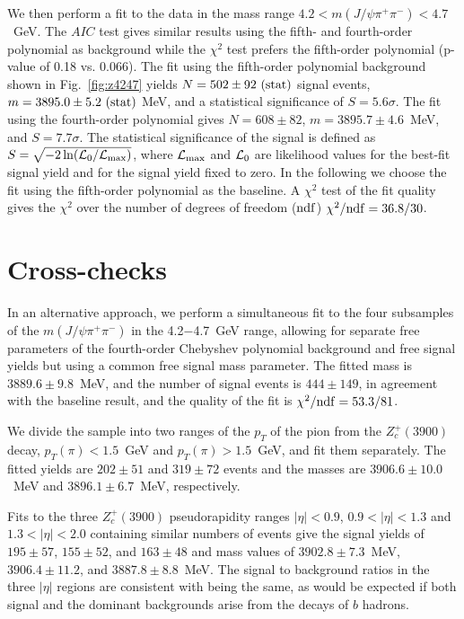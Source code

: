\documentclass[aps,prd,twocolumn,superscriptaddress,groupedaddress,floatfix]{revtex4}
\begin{document}
 We then perform a  fit to the data in the mass
 range  $4.2<m(J/\psi \pi^+ \pi^-)<4.7$~GeV.
The $AIC$ test gives similar results using  the fifth- and fourth-order polynomial
as background while the $\chi^2$ test prefers the fifth-order polynomial
(p-value of 0.18 vs. 0.066). 
The fit using the fifth-order polynomial background shown in  Fig.~\ref{fig:z4247}  yields  
 $N=502\pm 92~({\rm stat})$ signal events,
$m=3895.0\pm5.2~({\rm stat}) $ MeV, and a statistical significance of $S=5.6\sigma$.
The fit using the fourth-order polynomial gives 
$N=608\pm82$, $m=3895.7\pm4.6$~MeV,  and $S=7.7\sigma$.
The statistical significance of the signal 
is defined as $S=\sqrt{-2\, {\rm ln} ({\cal{L}}_0 /{\cal{L}}_{\rm max}) }$,
where ${\cal{L}}_{\rm max}$ and ${\cal{L}}_0$  are likelihood values for the
best-fit signal yield and for the signal yield fixed to zero.
In the following we choose the fit using the fifth-order polynomial as the baseline.
A $\chi^2$ test of the fit quality gives the  $\chi^2$ over the number of degrees
of freedom ($\rm ndf$)   $\chi^2/{\rm ndf}=36.8/30$.






\section{Cross-checks}


In an alternative approach, we perform a simultaneous fit to the four  subsamples
of the $m(J/\psi \pi^+ \pi^-)$ in the  4.2$-$4.7~GeV range,
allowing for separate free   parameters  of the fourth-order Chebyshev polynomial background  and
free  signal yields but using a common free signal mass
parameter.  
The fitted mass is 
$3889.6 \pm 9.8$~MeV, and the number of signal events is $444 \pm 149$, in agreement with the baseline
result,
and the quality of the fit is $\chi^2/{\rm ndf}=53.3/81$.


We divide the sample into two ranges of the  $p_T$ of the pion from the $Z_c^+(3900)$ decay,
  $p_T(\pi)<1.5$~GeV and  $p_T(\pi)>1.5$~GeV,
 and fit them
separately.
The fitted yields are  $202\pm51$ and $319\pm72$ events
and the masses are $3906.6\pm10.0$~MeV and $3896.1\pm6.7$~MeV, respectively.

Fits to the three $Z_c^+(3900)$ pseudorapidity  ranges $|\eta|<0.9$, $0.9<|\eta|<1.3$ and $1.3<|\eta|<2.0$
containing similar numbers of events
 give the signal yields of
$195\pm 57$, $155\pm52$, and $163\pm48$ and  mass values of $3902.8\pm7.3$~MeV,
$3906.4\pm11.2$, and $3887.8\pm8.8$~MeV. 
The signal to  background ratios  in the three $|\eta |$ regions are consistent with
 being the same, as would be expected if both signal and the dominant backgrounds
 arise from the decays of $b$ hadrons.
\end{document}
